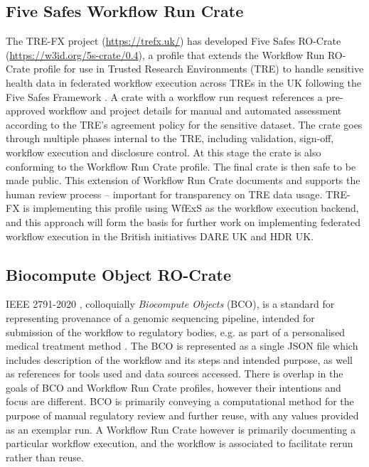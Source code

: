 \documentclass[10pt,letterpaper]{article}
\begin{document}
\begin{table}[!ht]
\begin{adjustwidth}{-1.5cm}{0in}
\begin{tabular}{p{35mm}|p{40mm}|p{40mm}}
  \end{tabular}
  \label{rocrate_prov_mapping}
  \end{adjustwidth}
\end{table}
  

\subsection{Five Safes Workflow Run Crate}\label{trusted-workflow-run-crate}

The TRE-FX project (\url{https://trefx.uk/}) has developed Five Safes RO-Crate (\url{https://w3id.org/5s-crate/0.4}), a profile that extends the Workflow Run RO- Crate profile for use in Trusted Research Environments (TRE) to handle sensitive health data in federated workflow execution across TREs in the UK following the Five Safes Framework \cite{Desai 2016}.
A crate with a workflow run request references a pre-approved workflow and project details for manual and automated assessment according to the TRE's agreement policy for the sensitive dataset. 
The crate goes through multiple phases internal to the TRE, including validation, sign-off, workflow execution and disclosure control.
At this stage the crate is also conforming to the Workflow Run Crate profile.
The final crate is then safe to be made public.
This extension of Workflow Run Crate documents and supports the human review process -- important for transparency on TRE data usage. 
TRE-FX is implementing this profile using WfExS as the workflow execution backend, and this approach will form the basis for further work on implementing federated workflow execution in the British initiatives DARE UK and HDR UK.    


\subsection{Biocompute Object RO-Crate}\label{bco-crate}
IEEE 2791-2020 \cite{Mazumder 2020}, colloquially \emph{Biocompute Objects} (BCO), is a standard for representing provenance of a genomic sequencing pipeline, intended for submission of the workflow to regulatory bodies, e.g. as part of a personalised medical treatment method \cite{Alterovitz 2018}. 
The BCO is represented as a single JSON file which includes description of the workflow and its steps and intended purpose, as well as references for tools used and data sources accessed. 
There is overlap in the goals of BCO and Workflow Run Crate profiles, however their intentions and focus are different. 
BCO is primarily conveying a computational method for the purpose of manual regulatory review and further reuse, with any values provided as an exemplar run.  
A Workflow Run Crate however is primarily documenting a particular workflow execution, and the workflow is associated to facilitate rerun rather than reuse. 
\end{document}
